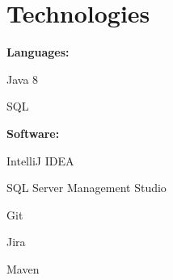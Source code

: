 \documentclass[letterpaper,11pt]{article}
\begin{document}
\section{Technologies}
\textbf{Languages:}
\hfill
\begin{itemize*}
	\item Java 8
	\item SQL
\end{itemize*}
\newline
\textbf{Software:}
\hfill
\begin{itemize*}
	\item IntelliJ IDEA
	\item SQL Server Management Studio
	\item Git
	\item Jira
	\item Maven
\end{itemize*}

\end{document}
